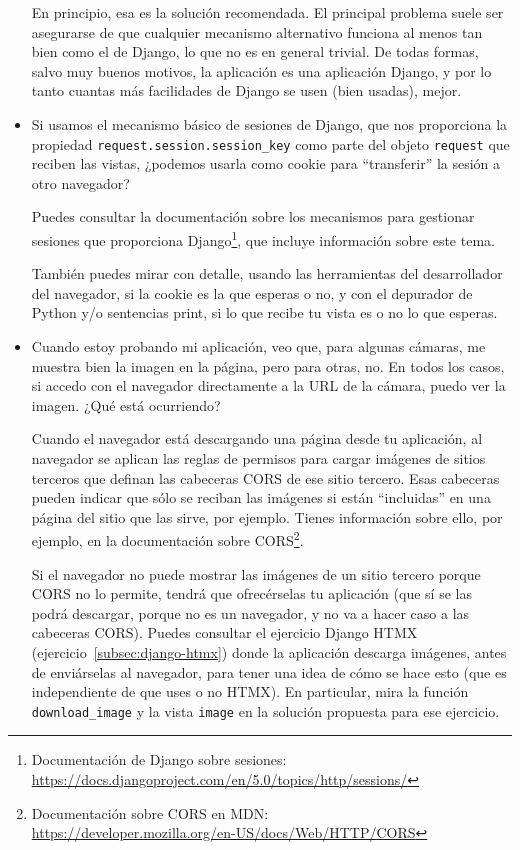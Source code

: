 \begin{itemize}
  En principio, esa es la solución recomendada. El principal problema suele ser asegurarse de que cualquier mecanismo alternativo funciona al menos tan bien como el de Django, lo que no es en general trivial. De todas formas, salvo muy buenos motivos, la aplicación es una aplicación Django, y por lo tanto cuantas más facilidades de Django se usen (bien usadas), mejor.

\item Si usamos el mecanismo básico de sesiones de Django, que nos proporciona la propiedad \texttt{request.session.session\_key} como parte del objeto \texttt{request} que reciben las vistas, ¿podemos usarla como cookie para ``transferir'' la sesión a otro navegador?

  Puedes consultar la documentación sobre los mecanismos para gestionar sesiones que proporciona Django\footnote{Documentación de Django sobre sesiones:\\
    \url{https://docs.djangoproject.com/en/5.0/topics/http/sessions/}}, que incluye información sobre este tema.

  También puedes mirar con detalle, usando las herramientas del desarrollador del navegador, si la cookie es la que esperas o no, y con el depurador de Python y/o sentencias print, si lo que recibe tu vista es o no lo que esperas.

\item Cuando estoy probando mi aplicación, veo que, para algunas cámaras, me muestra bien la imagen en la página, pero para otras, no. En todos los casos, si accedo con el navegador directamente a la URL de la cámara, puedo ver la imagen. ¿Qué está ocurriendo?

  Cuando el navegador está descargando una página desde tu aplicación, al navegador se aplican las reglas de permisos para cargar imágenes de sitios terceros que definan las cabeceras CORS de ese sitio tercero. Esas cabeceras pueden indicar que sólo se reciban las imágenes si están ``incluidas'' en una página del sitio que las sirve, por ejemplo. Tienes información sobre ello, por ejemplo, en la documentación sobre CORS\footnote{Documentación sobre CORS en MDN: \\
    \url{https://developer.mozilla.org/en-US/docs/Web/HTTP/CORS}}.

  Si el navegador no puede mostrar las imágenes de un sitio tercero porque CORS no lo permite, tendrá que ofrecérselas tu aplicación (que sí se las podrá descargar, porque no es un navegador, y no va a hacer caso a las cabeceras CORS). Puedes consultar el ejercicio Django HTMX (ejercicio~\ref{subsec:django-htmx}) donde la aplicación descarga imágenes, antes de enviárselas al navegador, para tener una idea de cómo se hace esto (que es independiente de que uses o no HTMX). En particular, mira la función \texttt{download\_image} y la vista \texttt{image} en la solución propuesta para ese ejercicio.
  

\end{itemize}
